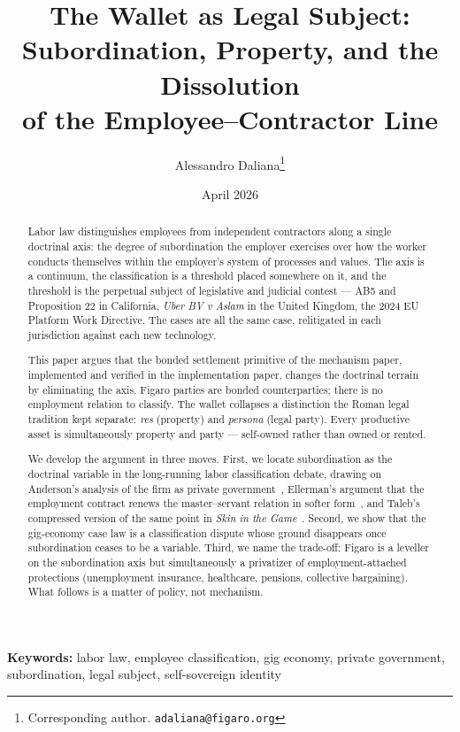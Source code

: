 \documentclass[11pt,a4paper]{article}
\title{%
  The Wallet as Legal Subject:\\
  Subordination, Property, and the Dissolution\\
  of the Employee--Contractor Line%
}
\author{
  Alessandro Daliana\thanks{Corresponding author. \texttt{adaliana@figaro.org}}
}
\date{April 2026}
\theoremstyle{remark}
\begin{document}
\maketitle

\begin{abstract}
Labor law distinguishes employees from independent contractors along
a single doctrinal axis: the degree of subordination the employer
exercises over how the worker conducts themselves within the
employer's system of processes and values. The axis is a continuum,
the classification is a threshold placed somewhere on it, and the
threshold is the perpetual subject of legislative and judicial
contest --- AB5 and Proposition 22 in California, \emph{Uber BV v
Aslam} in the United Kingdom, the 2024 EU Platform Work Directive.
The cases are all the same case, relitigated in each jurisdiction
against each new technology.

This paper argues that the bonded settlement primitive
of the mechanism paper, implemented and verified
in the implementation paper, changes the doctrinal terrain by
eliminating the axis. Figaro parties are bonded counterparties;
there is no employment relation to classify. The wallet collapses a
distinction the Roman legal tradition kept separate: \emph{res}
(property) and \emph{persona} (legal party). Every productive asset
is simultaneously property and party --- self-owned rather than
owned or rented.

We develop the argument in three moves. First, we locate
subordination as the doctrinal variable in the long-running labor
classification debate, drawing on Anderson's analysis of the firm
as private government~\citep{anderson2017private}, Ellerman's
argument that the employment contract renews the master--servant
relation in softer form~\citep{ellerman1992property}, and Taleb's
compressed version of the same point in \emph{Skin in the
Game}~\citep{taleb2018skin}. Second, we show that the gig-economy
case law is a classification dispute whose ground disappears once
subordination ceases to be a variable. Third, we name the
trade-off: Figaro is a leveller on the subordination axis but
simultaneously a privatizer of employment-attached protections
(unemployment insurance, healthcare, pensions, collective
bargaining). What follows is a matter of policy, not mechanism.
\end{abstract}

\medskip
\noindent\textbf{Keywords:}
labor law, employee classification, gig economy, private government,
subordination, legal subject, self-sovereign identity
\end{document}
